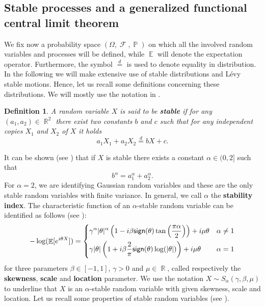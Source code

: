 \documentclass[]{amsart}
\numberwithin{equation}{section}
\newtheorem{defn}{Definition}[section]
\theoremstyle{remark}
\theoremstyle{definition}
\DeclareMathOperator{\E}{\mathbb{E}}
\DeclareMathOperator{\R}{\mathbb{R}}
\DeclareMathOperator{\cF}{\mathcal{F}}
\DeclareMathOperator{\bP}{\mathbb{P}}
\begin{document}
\subsection{Stable processes and a generalized functional central limit theorem}\label{sec:stab}
We fix now a probability space $(\Omega, \cF, \bP)$ on which all the involved random variables and processes will be defined, while $\E$ will denote the expectation operator. Furthermore, the symbol $\overset{d}{=}$ is used to denote equality in distribution. In the following we will make extensive use of stable distributions and L\'evy stable motions. Hence, let us recall some definitions concerning these distributions. We will mostly use the notation in \cite{whitt2002stochastic}.
\begin{defn}
	A random variable $X$ is said to be \textbf{stable} if for any $(a_1,a_2) \in \R^2$ there exist two constants $b$ and $c$ such that for any independent copies $X_1$ and $X_2$ of $X$ it holds
	\begin{equation*}
		a_1X_1+a_2X_2 \overset{d}{=}bX+c.
	\end{equation*}
\end{defn}
It can be shown (see \cite[Theorem 1.1.2]{samorodnitsky1994non}) that if $X$ is stable there exists a constant $\alpha \in (0,2]$ such that
\begin{equation*}
	b^\alpha=a_1^\alpha+a_2^\alpha.
\end{equation*}	
For $\alpha=2$, we are identifying Gaussian random variables and these are the only stable random variables with finite variance. In general, we call $\alpha$ the \textbf{stability index}. The characteristic function of an $\alpha$-stable random variable can be identified as follows (see \cite[Definition 1.1.6]{samorodnitsky1994non}):
\begin{equation*}
	-\log(\E[e^{i\theta X}])=\begin{cases} \displaystyle \gamma^\alpha|\theta|^\alpha\left(1-i\beta {\sf sign}(\theta)\tan\left(\frac{\pi \alpha}{2}\right)\right)+i\mu \theta & \alpha \not = 1 \\[7pt]
		\displaystyle 
		\gamma |\theta|\left(1+i\beta \frac{2}{\pi}{\sf sign}(\theta)\log(|\theta|)\right)+i\mu \theta & \alpha=1\end{cases}		
\end{equation*}
for three parameters $\beta \in [-1,1]$, $\gamma>0$ and $\mu \in \R$, called respectively the \textbf{skewness}, \textbf{scale} and \textbf{location} parameter. We use the notation $X \sim S_\alpha(\gamma,\beta,\mu)$ to underline that $X$ is an $\alpha$-stable random variable with given skewness, scale and location. Let us recall some properties of stable random variables (see \cite[Section 1.2]{samorodnitsky1994non}).
\end{document}
